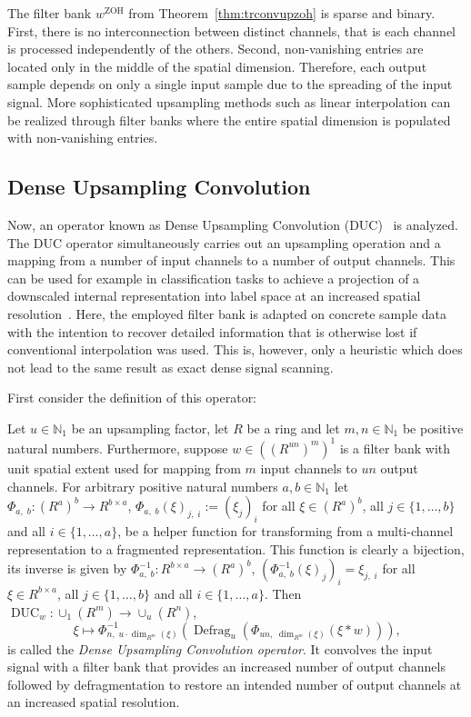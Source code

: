 \documentclass[journal]{IEEEtran}
\newcommand{\N}{\mathbb{N}}
\newcommand{\conv}{\ast}
\newcommand{\discint}[2]{\{#1,\dotsc,#2\}}
\newcommand{\inint}[2]{\in\discint{#1}{#2}}
\DeclareMathOperator{\Defragmentation}{Defrag}
\DeclareMathOperator{\ZOH}{ZOH}
\DeclareMathOperator{\DUC}{DUC}
\begin{document}
The filter bank $w^{\ZOH}$ from Theorem~\ref{thm:trconvupzoh} is sparse and binary.
First, there is no interconnection between distinct channels, that is each channel is processed independently of the others.
Second, non-vanishing entries are located only in the middle of the spatial dimension.
Therefore, each output sample depends on only a single input sample due to the spreading of the input signal.
More sophisticated upsampling methods such as linear interpolation can be realized through filter banks where the entire spatial dimension is populated with non-vanishing entries.

\subsection{Dense Upsampling Convolution}
Now, an operator known as Dense Upsampling Convolution (DUC)~ is analyzed.
The DUC operator simultaneously carries out an upsampling operation and a mapping from a number of input channels to a number of output channels.
This can be used for example in classification tasks to achieve a projection of a downscaled internal representation into label space at an increased spatial resolution~.
Here, the employed filter bank is adapted on concrete sample data with the intention to recover detailed information that is otherwise lost if conventional interpolation was used.
This is, however, only a heuristic which does not lead to the same result as exact dense signal scanning.

First consider the definition of this operator:
\begin{definition}
\label{def:duc}
Let $u\in\N_1$ be an upsampling factor, let $R$ be a ring and let $m,n\in\N_1$ be positive natural numbers.
Furthermore, suppose $w\in((R^{un})^m)^1$ is a filter bank with unit spatial extent used for mapping from $m$ input channels to $un$ output channels.
For arbitrary positive natural numbers $a,b\in\N_1$ let $\Phi_{a,\; b}\colon (R^a)^b \to R^{b\times a}$, $\Phi_{a,\; b}(\xi)_{j,\; i} := (\xi_j)_i$ for all $\xi\in(R^a)^b$, all $j\inint{1}{b}$ and all $i\inint{1}{a}$, be a helper function for transforming from a multi-channel representation to a fragmented representation.
This function is clearly a bijection, its inverse is given by $\Phi_{a,\; b}^{-1}\colon R^{b\times a} \to (R^a)^b$, $(\Phi_{a,\; b}^{-1}(\xi)_j)_i = \xi_{j,\; i}$ for all $\xi\in R^{b\times a}$, all $j\inint{1}{b}$ and all $i\inint{1}{a}$.
Then $\DUC_w\colon\cup_1(R^m)\to\cup_u(R^n)$,
\begin{displaymath}
  \xi\mapsto \Phi_{n,\; u\cdot\dim_{R^m}(\xi)}^{-1}( \Defragmentation_u( \Phi_{un,\; \dim_{R^m}(\xi)}( \xi \conv w ) ) )\text{,}
\end{displaymath}
is called the \emph{Dense Upsampling Convolution operator}.
It convolves the input signal with a filter bank that provides an increased number of output channels followed by defragmentation to restore an intended number of output channels at an increased spatial resolution.
\end{definition}
\end{document}
